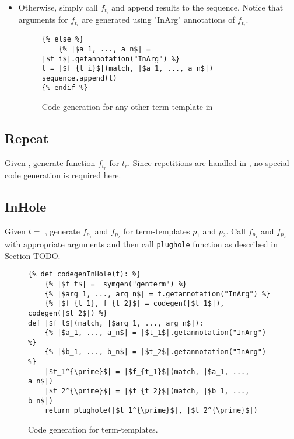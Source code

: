 \begin{itemize}
\item Otherwise, simply call $f_{t_i}$ and append results to the sequence. Notice that arguments for $f_{t_i}$ are generated using "InArg" annotations of $f_{t_i}$. 

\begin{figure}
\begin{verbatim}
{% else %}
	{% |$a_1, ..., a_n$| = |$t_i$|.getannotation("InArg") %}
t = |$f_{t_i}$|(match, |$a_1, ..., a_n$|)
sequence.append(t)
{% endif %}
\end{verbatim}
\caption{Code generation for any other term-template in \TermSequenceNoArg}
\label{codegen-term-sequence-anyother}
\end{figure}
\end{itemize}

\subsection{Repeat}
Given \TermRepeat, generate function $f_{t_r}$ for $t_r$. Since repetitions are handled in \TermSequenceNoArg, no special code generation is required here.

\subsection{InHole}
Given $t=$ \TermInHole, generate $f_{p_1}$ and $f_{p_2}$ for term-templates $p_1$ and $p_2$. Call $f_{p_1}$ and $f_{p_2}$ with appropriate arguments and then call \texttt{plughole} function as described in Section TODO. 

\begin{figure}
\begin{verbatim}
{% def codegenInHole(t): %}
	{% |$f_t$| =  symgen("genterm") %}
	{% |$arg_1, ..., arg_n$| = t.getannotation("InArg") %}
	{% |$f_{t_1}, f_{t_2}$| = codegen(|$t_1$|), codegen(|$t_2$|) %}
def |$f_t$|(match, |$arg_1, ..., arg_n$|):
	{% |$a_1, ..., a_n$| = |$t_1$|.getannotation("InArg") %}
	{% |$b_1, ..., b_n$| = |$t_2$|.getannotation("InArg") %}
	|$t_1^{\prime}$| = |$f_{t_1}$|(match, |$a_1, ..., a_n$|)
	|$t_2^{\prime}$| = |$f_{t_2}$|(match, |$b_1, ..., b_n$|)
	return plughole(|$t_1^{\prime}$|, |$t_2^{\prime}$|) 
\end{verbatim}
\caption{Code generation for \PatternInHoleNoArg term-templates.}
\label{codegen-term-inhole}
\end{figure}


